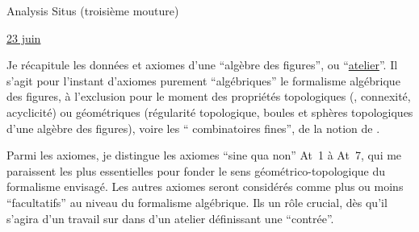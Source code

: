 \begin{center}Analysis Situs (troisième mouture)\end{center}

\uline{23 juin}

Je récapitule les données et axiomes d'une ``algèbre des figures'', ou ``\uline{atelier}''. \margin{\unsure{--}}Il s'agit pour l'instant d'axiomes purement ``algébriques''  le formalisme algébrique des figures, à l'exclusion pour le moment des propriétés topologiques (, connexité, acyclicité) ou  géométriques (régularité topologique, boules et sphères topologiques d'une algèbre des figures), voire les `` combinatoires fines'',  de la notion de .

Parmi les axiomes, je distingue les axiomes ``sine qua non'' At~1 à At~7, qui me paraissent les plus essentielles pour fonder le sens géométrico-topologique du formalisme envisagé. Les autres axiomes seront considérés comme plus ou moins ``facultatifs'' au niveau du formalisme algébrique. Ils    un rôle crucial, dès qu'il s'agira d'un travail sur  dans 
 d'un atelier définissant une ``contrée''.

